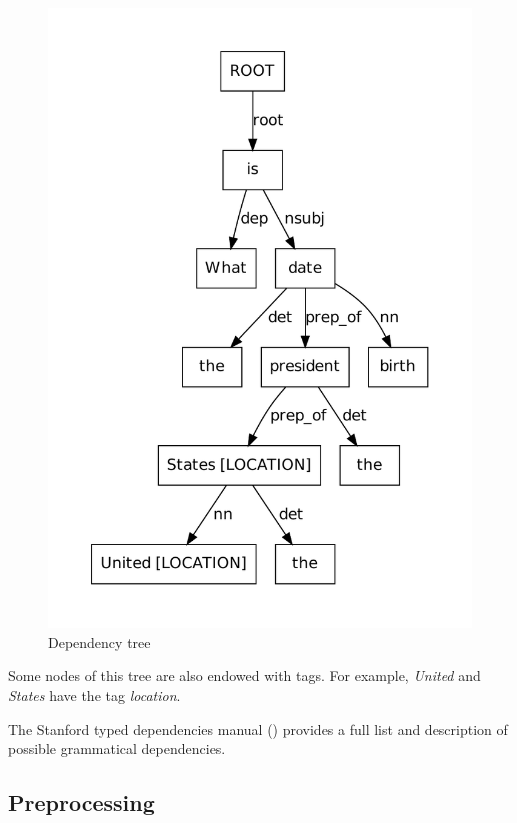 \begin{figure}
  \centering
  \caption{Dependency tree}
  \label{tree_one}
    \includegraphics[scale=0.6]{../examples_NLP_grammatical/tree1.pdf}
\end{figure}

Some nodes of this tree are also endowed with tags. For example, \emph{United} and \emph{States} have the tag \emph{location}.

The Stanford typed dependencies manual (\cite{stanfordDep}) provides a full list and description of possible grammatical dependencies.


\subsection{Preprocessing}

